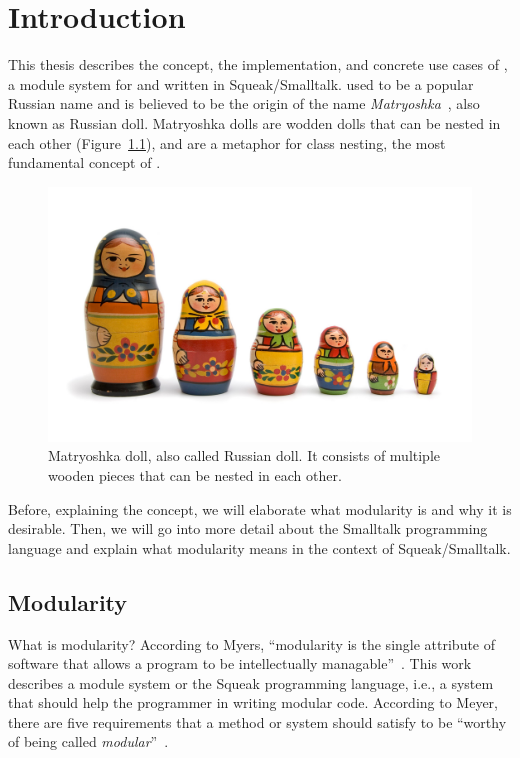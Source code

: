 \chapter{Introduction}
This thesis describes the concept, the implementation, and concrete use cases of \emph{\msname}, a module system for and written in Squeak/Smalltalk. \msname used to be a popular Russian name and is believed to be the origin of the name \emph{Matryoshka}~\cite{dixon1998encyclopedia}, also known as Russian doll. Matryoshka dolls are wodden dolls that can be nested in each other (Figure~\ref{fig:matryoshka}), and are a metaphor for class nesting, the most fundamental concept of \msname.

\begin{figure}[!htp]
	\includegraphics[width=\textwidth]{matryoshka.jpg}
	\caption[Matryoshka doll]{Matryoshka doll, also called Russian doll. It consists of multiple wooden pieces that can be nested in each other.}
	\label{fig:matryoshka}
\end{figure}

Before, explaining the concept, we will elaborate what modularity is and why it is desirable. Then, we will go into more detail about the Smalltalk programming language and explain what modularity means in the context of Squeak/Smalltalk.

\section{Modularity}
What is modularity? According to Myers, ``modularity is the single attribute of software that allows a program to be intellectually managable''~\cite{myers1978composite}. This work describes a module system or the Squeak programming language, i.e., a system that should help the programmer in writing modular code. According to Meyer, there are five requirements that a method or system should satisfy to be ``worthy of being called \emph{modular}''~\cite{Meyer:1988:OSC:534929}.

